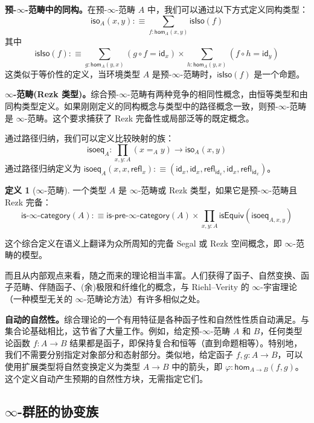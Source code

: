 \documentclass[12pt,a4paper]{article}
\theoremstyle{definition}
\newtheorem{definition}{定义}[section]
\theoremstyle{definition}
\begin{document}
\textbf{预-$\infty$-范畴中的同构。}在预-$\infty$-范畴 $A$ 中，我们可以通过以下方式定义同构类型：
\[
\mathsf{iso}_A(x,y) :\equiv \sum_{f:\mathsf{hom}_A(x,y)} \mathsf{isIso}(f)
\]
其中
\[
\mathsf{isIso}(f) :\equiv \sum_{g:\mathsf{hom}_A(y,x)} (g \circ f = \mathsf{id}_x) \times \sum_{h:\mathsf{hom}_A(y,x)} (f \circ h = \mathsf{id}_y)
\]
这类似于等价性的定义，当环境类型 $A$ 是预-$\infty$-范畴时，$\mathsf{isIso}(f)$ 是一个命题。

\textbf{$\infty$-范畴(Rezk 类型)。}综合预-$\infty$-范畴有两种竞争的相同性概念，由恒等类型和由同构类型定义。如果刚刚定义的同构概念与类型中的路径概念一致，则预-$\infty$-范畴是 $\infty$-范畴。这个要求捕获了 Rezk 完备性或局部泛等的既定概念。

通过路径归纳，我们可以定义比较映射的族：
\[
\mathsf{isoeq}_A : \prod_{x,y:A} (x =_A y) \to \mathsf{iso}_A(x,y)
\]
通过路径归纳定义为 $\mathsf{isoeq}_A(x,x,\mathsf{refl}_x) :\equiv (\mathsf{id}_x, \mathsf{id}_x, \mathsf{refl}_{\mathsf{id}_x}, \mathsf{id}_x, \mathsf{refl}_{\mathsf{id}_x})$。

\begin{definition}[$\infty$-范畴]
一个类型 $A$ 是 $\infty$-范畴或 Rezk 类型，如果它是预-$\infty$-范畴且 Rezk 完备：
\[
\mathsf{is\text{-}\infty\text{-}category}(A) :\equiv \mathsf{is\text{-}pre\text{-}\infty\text{-}category}(A) \times \prod_{x,y:A} \mathsf{isEquiv}(\mathsf{isoeq}_{A,x,y})
\]
\end{definition}

这个综合定义在语义上翻译为众所周知的完备 Segal 或 Rezk 空间概念，即 $\infty$-范畴的模型。

而且从内部观点来看，随之而来的理论相当丰富。人们获得了函子、自然变换、函子范畴、伴随函子、(余)极限和纤维化的概念，与 Riehl--Verity 的 $\infty$-宇宙理论（一种模型无关的 $\infty$-范畴论方法）有许多相似之处。

\textbf{自动的自然性。}综合理论的一个有用特征是各种函子性和自然性性质自动满足。与集合论基础相比，这节省了大量工作。例如，给定预-$\infty$-范畴 $A$ 和 $B$，任何类型论函数 $f:A \to B$ 结果都是函子，即保持复合和恒等（直到命题相等）。特别地，我们不需要分别指定对象部分和态射部分。类似地，给定函子 $f,g:A \to B$，可以使用扩展类型将自然变换定义为类型 $A \to B$ 中的箭头，即 $\varphi:\mathsf{hom}_{A \to B}(f,g)$。这个定义自动产生预期的自然性方块，无需指定它们。

\subsection{$\infty$-群胚的协变族}
\end{document}
